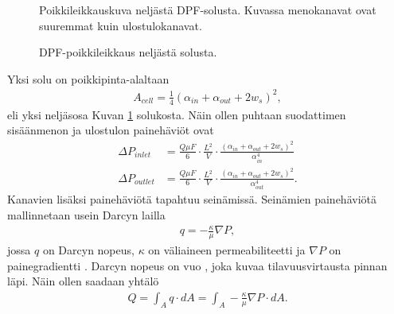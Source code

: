 \begin{figure}[H]
    \centering 
               {Poikkileikkauskuva neljästä DPF-solusta. Kuvassa menokanavat ovat suuremmat kuin ulostulokanavat.}
    \caption{DPF-poikkileikkaus neljästä solusta.}
    \label{fig:hac_dpf_clean}
\end{figure}
Yksi solu on poikkipinta-alaltaan
\begin{align}
    A_{cell}=\frac{1}{4}(\alpha_{in}+\alpha_{out}+2w_s)^2,
\end{align}
eli yksi neljäsosa Kuvan \ref{fig:hac_dpf_clean} solukosta. Näin ollen puhtaan suodattimen sisäänmenon ja ulostulon painehäviöt ovat
\begin{align}
    \Delta P_{inlet} &=\frac{Q \mu F}{6}\cdot \frac{L^2}{V} \cdot \frac{(\alpha_{in}+\alpha_{out}+2w_s)^2}{\alpha_{in}^4} \label{eq:DeltaP_inlet_clean}
    \\ 
    \Delta P_{outlet} &=\frac{Q \mu F}{6}\cdot \frac{L^2}{V} \cdot \frac{(\alpha_{in}+\alpha_{out}+2w_s)^2}{\alpha_{out}^4}.
\end{align}
Kanavien lisäksi painehäviötä tapahtuu seinämissä. Seinämien painehäviötä mallinnetaan usein Darcyn lailla \cite{dieselnet_wall_flow_monolith}\cite{Konstandopoulos1989_wallflow}
\begin{align}
    q = - \frac{\kappa}{\mu}\nabla P,
\end{align}
jossa \(q\) on Darcyn nopeus, \(\kappa\) on väliaineen permeabiliteetti ja \(\nabla P\) on painegradientti \cite{feder2021_porous}. 
 Darcyn nopeus on vuo \cite{reible_env_eng}, joka kuvaa tilavuusvirtausta pinnan läpi. Näin ollen saadaan yhtälö
\begin{align}
    Q = \int_A q \cdot dA = \int_A - \frac{\kappa}{\mu} \nabla P \cdot dA.
\end{align}
